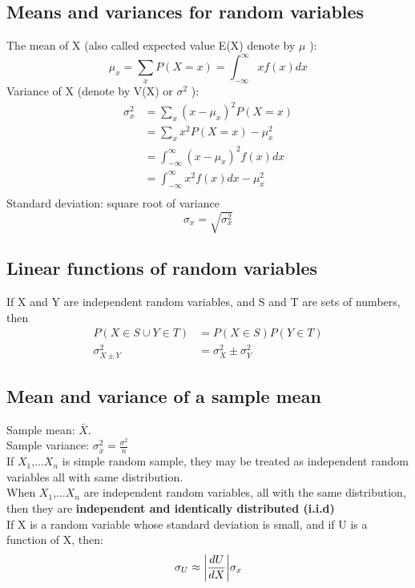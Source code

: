 \documentclass[../main.tex]{subfiles}
\begin{document}
\subsection{Means and variances for random variables}
The mean of X (also called expected value E(X) denote by $\mu$ ):
\begin{equation*}
\mu _x = \sum_{x}{P(X=x)}=\int_{-\infty}^{\infty}xf(x)dx
\end{equation*}
Variance of X (denote by V(X) or $\sigma ^2$ ):
\begin{align*}
\sigma _x^2 
&= \sum_{x}{(x-\mu _x)^2 P(X=x)}\\
&=\sum_{x}{x^2 P(X=x)-\mu_x^2}\\
&=\int_{-\infty}^{\infty}(x-\mu_x)^2f(x)dx\\
&=\int_{-\infty}^{\infty}x^2f(x)dx-\mu_x^2\\
\end{align*}
Standard deviation: square root of variance
\begin{equation*}
\sigma _x = \sqrt{\sigma_x^2}
\end{equation*}

\subsection{Linear functions of random variables}
If X and Y are independent random variables, and S and T are sets of numbers, then
\begin{align*}
    P(X\in S \cup Y\in T) &= P(X\in S)P(Y \in T)\\
    \sigma _{X\pm Y}^2 &=\sigma _X^2 \pm \sigma _Y^2 
\end{align*}
\subsection{Mean and variance of a sample mean}
Sample mean: $\bar{X}$.\\
Sample variance: $\sigma_{\bar{x}}^2=\frac{\sigma ^2}{n}$
\\
If $X_1$,...$X_n$ is simple random sample, they may be treated as independent random variables all with same distribution.\\
When $X_1$,...$X_n$ are independent random variables, all with the same distribution, then they are \textbf{independent
and identically distributed (i.i.d)}\\
If X is a random variable whose standard deviation is small, and if U is a function of X, then:
\begin{equation*}
    \sigma _U \approx \abs{\frac{dU}{dX}}\sigma _x
\end{equation*}
\end{document}
